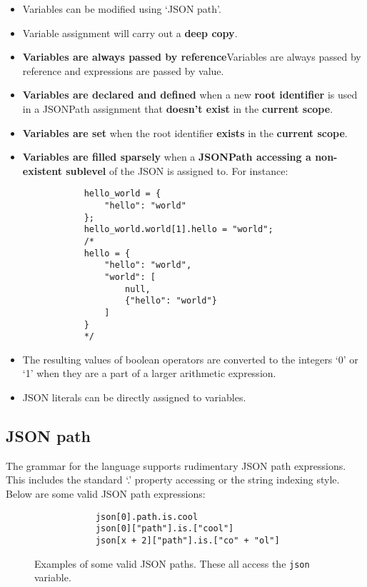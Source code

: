 \documentclass[12pt, letterpaper]{article}
\begin{document}
\begin{center}
    \begin{itemize} 
        \item Variables can be modified using `JSON path'.
        \item Variable assignment will carry out a \textbf{deep copy}.
        \item \textbf{Variables are always passed by reference}{Variables are always passed by reference} and expressions are passed by value.
        \item \textbf{Variables are declared and defined} when a new \textbf{root identifier} is used in a JSONPath assignment that \textbf{doesn't exist} in the \textbf{current scope}.
        \item \textbf{Variables are set} when the root identifier \textbf{exists} in the \textbf{current scope}.
        \item \textbf{Variables are filled sparsely} when a \textbf{JSONPath accessing a non-existent sublevel} of the JSON is assigned to. For instance:
        \begin{verbatim}
            hello_world = {
                "hello": "world"
            };
            hello_world.world[1].hello = "world";
            /*
            hello = {
                "hello": "world",
                "world": [
                    null,
                    {"hello": "world"}
                ]
            }
            */
        \end{verbatim}
        \item The resulting values of boolean operators are converted to the integers `0' or `1' when they are a part of a larger arithmetic expression.
        \item JSON literals can be directly assigned to variables.
    \end{itemize}
\end{center}

\subsection{JSON path}

The grammar for the language supports rudimentary JSON path expressions. This includes the standard `.' property accessing or the string indexing style. Below are some valid JSON path expressions:

\begin{figure}[H]
    \begin{center}
        \begin{verbatim}
            json[0].path.is.cool
            json[0]["path"].is.["cool"]
            json[x + 2]["path"].is.["co" + "ol"]
        \end{verbatim}
    \end{center}
    \vspace{-1.5em}
    \cprotect\caption{Examples of some valid JSON paths. These all access the \verb|json| variable.}
\end{figure}
\end{document}
